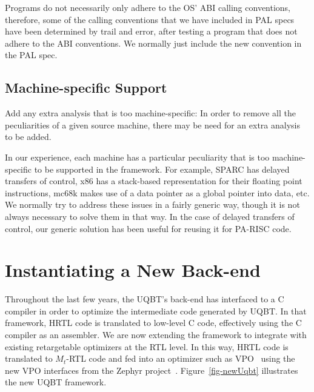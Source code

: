 	Programs do not necessarily only adhere to the OS' ABI calling 
	conventions, therefore, some of the calling conventions that 
	we have included in PAL specs have been determined by trail and 
	error, after testing a program that does not adhere to the 
	ABI conventions.  We normally just include the new convention in
	the PAL spec. 

\subsection{Machine-specific Support}
	Add any extra analysis that is too machine-specific: 
	In order to remove all the peculiarities of a given source 
	machine, there may be need for an extra analysis to be added. 

	In our experience, each machine has a particular peculiarity 
	that is too machine-specific to be supported in the framework. 
	For example, SPARC has delayed transfers of control, x86 has 
	a stack-based representation for their floating point instructions, 
	mc68k makes use of a data pointer as a global pointer into data, 
	etc.  We normally try to address these issues in a fairly 
	generic way, though it is not always necessary to solve them 
	in that way.  In the case of delayed transfers of control, our 
	generic solution has been useful for reusing it for PA-RISC 
	code.  


\section{Instantiating a New Back-end}
Throughout the last few years, the UQBT's back-end has interfaced 
to a C compiler in order to optimize the intermediate code 
generated by UQBT.  In that framework, HRTL code is translated
to low-level C code, effectively using the C compiler as an 
assembler.  
We are now extending the framework to integrate with existing 
retargetable optimizers at the RTL level.  In this way, HRTL 
code is translated to $M_t$-RTL code and fed into an optimizer
such as VPO~\cite{Beni88} using the new VPO interfaces from the
Zephyr project~\cite{Vpo98}.  
Figure~\ref{fig-newUqbt} illustrates the new UQBT framework.  


